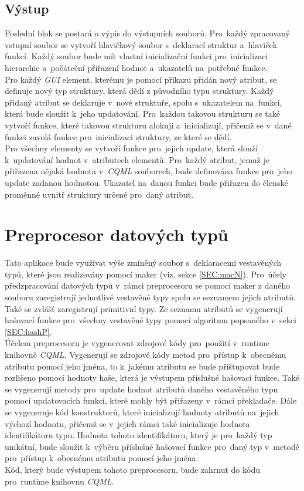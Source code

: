 \documentclass[11pt,twoside,a4paper]{book}
\begin{document}
\subsection{Výstup}
Poslední blok se postará o výpis do výstupních souborů. Pro~každý zpracovaný vstupní soubor se vytvoří hlavičkový soubor s~deklarací struktur a~hlaviček funkcí. Každý soubor bude mít vlastní inicializační funkci pro~inicializaci hierarchie a~počáteční přiřazení hodnot a~ukazatelů na~potřebné funkce.\\
Pro každý \textit{GUI} element, kterému je pomocí příkazu přidán nový atribut, se definuje nový typ struktury, která dědí z původního typu struktury. Každý přidaný atribut se deklaruje v~nové struktuře, spolu s~ukazatelem na~funkci, která bude sloužit k~jeho updatování. Pro~každou takovou strukturu se také vytvoří funkce, které takovou strukturu alokují a~inicializují, přičemž se v~dané funkci zavolá funkce pro~inicializaci struktury, ze které se dědí.\\
Pro všechny elementy se vytvoří funkce pro~jejich update, která slouží k~updatování hodnot v~atributech elementů. Pro~každý atribut, jemuž je přiřazena nějaká hodnota v~\textit{CQML} souborech, bude definována funkce pro~jeho update zadanou hodnotou. Ukazatel na~danou funkci bude přiřazen do členské proměnné uvnitř struktury určené pro~daný atribut.\\  %


\section{\label{SEC:prepN}Preprocesor datových typů}
Tato aplikace bude využívat výše zmíněný soubor s~deklaracemi vestavěných typů, které jsou realizovány pomocí maker (viz. sekce \ref{SEC:macN}). Pro~účely předzpracování datových typů v~rámci preprocesoru se pomocí maker z daného souboru zaregistrují jednotlivé vestavěné typy spolu se seznamem jejich atributů. Také se zvlášť zaregistrují primitivní typy. Ze seznamu atributů se vygenerují hašovací funkce pro~všechny vestavěné typy pomocí algoritmu popsaného v~sekci \ref{SEC:hashP}.\\
Účelem preprocesoru je vygenerovat zdrojové kódy pro~použití v~runtime knihovně \textit{CQML}. Vygenerují se zdrojové kódy metod pro~přístup k~obecnému atributu pomocí jeho jména, to k~jakému atributu se bude přištupovat bude rozlišeno pomocí hodnoty haše, která je výstupem příslušné hašovací funkce. Také se vygenerují metody pro~update hodnot atributů daného vestavěného typu pomocí updatovacích funkcí, které mohly být přiřazeny v~rámci překladače. Dále se vygeneruje kód konstruktorů, které inicializují hodnoty atributů na~jejich výchozí hodnotu, přičemž se v~jejich rámci také inicializuje hodnota identifikátoru typu. Hodnota tohoto identifikátoru, který je pro~každý typ unikátní, bude sloužit k~výběru příslušné hašovací funkce pro~daný typ v~metodě pro~přístup k~obecnému atributu pomocí jeho jména.\\
Kód, který bude výstupem tohoto preprocesoru, bude zahrnut do kódu pro~runtime knihovnu \textit{CQML}.\\
\end{document}

